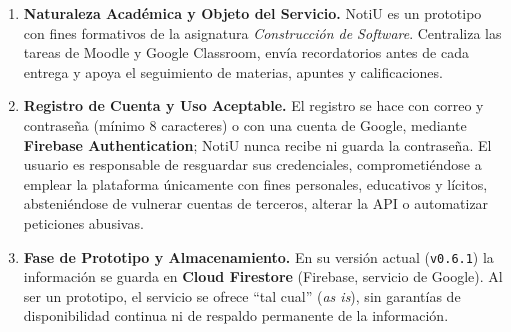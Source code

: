 \documentclass[10pt,letterpaper]{article}
\begin{document}
\vspace{2pt}
\begin{enumerate}[leftmargin=1.4em, itemsep=3.5pt, topsep=2pt, parsep=0pt, label=\textbf{\textcolor{notiuCrimson}{\arabic*.}}]

  \item \textbf{Naturaleza Académica y Objeto del Servicio.}
  NotiU es un prototipo con fines formativos de la asignatura \emph{Construcción de Software}. Centraliza las tareas de Moodle y Google Classroom, envía recordatorios antes de cada entrega y apoya el seguimiento de materias, apuntes y calificaciones.

  \item \textbf{Registro de Cuenta y Uso Aceptable.}
  El registro se hace con correo y contraseña (mínimo 8 caracteres) o con una cuenta de Google, mediante \textbf{Firebase Authentication}; NotiU nunca recibe ni guarda la contraseña. El usuario es responsable de resguardar sus credenciales, comprometiéndose a emplear la plataforma únicamente con fines personales, educativos y lícitos, absteniéndose de vulnerar cuentas de terceros, alterar la API o automatizar peticiones abusivas.

  \item \textbf{Fase de Prototipo y Almacenamiento.}
  En su versión actual (\texttt{v0.6.1}) la información se guarda en \textbf{Cloud Firestore} (Firebase, servicio de Google). Al ser un prototipo, el servicio se ofrece ``tal cual'' (\emph{as is}), sin garantías de disponibilidad continua ni de respaldo permanente de la información.


\end{enumerate}
\end{document}

